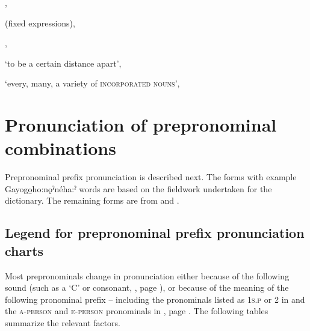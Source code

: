\begin{CayugaRelated}
\item{}, \\
\item{} (fixed expressions), \\
\item{}, \\
\item{} ‘to be a certain distance apart’, \\
\item{} ‘every, many, a variety of \textsc{incorporated nouns}’, 
\end{CayugaRelated}


\section{Pronunciation of prepronominal combinations} \label{Pronunciation of prepronominal combinations}
Prepronominal prefix pronunciation is described next. The forms with example Gayogo̱ho:nǫˀnéha:ˀ words are based on the fieldwork undertaken for the \citet{froman_english-cayugacayuga-english_2002} dictionary. The remaining forms are from \citet{foster_course_1993} and \citet{sasse_far_1998}. 


\subsection{Legend for prepronominal prefix pronunciation charts} \label{{Legend for prepronominal prefix pronunciation charts}}
Most prepronominals change in pronunciation either because of the following sound (such as a ‘C’ or consonant, , page \pageref{figtab:1:ppplegend}), or because of the meaning of the following pronominal prefix -- including the pronominals listed as \textsc{1s.p} or \textsc{2} in  and the \textsc{a-person} and \textsc{e-person} pronominals in , page \pageref{figtab:1:aepersons}. The following tables summarize the relevant factors.

